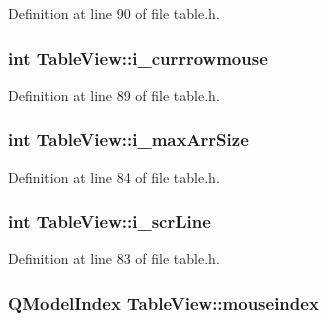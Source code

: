 Definition at line 90 of file table.h.

\hypertarget{classTableView_aed6ae9fb72681922a98a95e41ca84716}{
\subsubsection[{i\_\-currrowmouse}]{\setlength{\rightskip}{0pt plus 5cm}int {\bf TableView::i\_\-currrowmouse}}}
\label{classTableView_aed6ae9fb72681922a98a95e41ca84716}


Definition at line 89 of file table.h.

\hypertarget{classTableView_a02c154332908ba1622903ac621ef31bb}{
\subsubsection[{i\_\-maxArrSize}]{\setlength{\rightskip}{0pt plus 5cm}int {\bf TableView::i\_\-maxArrSize}}}
\label{classTableView_a02c154332908ba1622903ac621ef31bb}


Definition at line 84 of file table.h.

\hypertarget{classTableView_a5fc28c3171c5f26f2f60fac01173a57d}{
\subsubsection[{i\_\-scrLine}]{\setlength{\rightskip}{0pt plus 5cm}int {\bf TableView::i\_\-scrLine}}}
\label{classTableView_a5fc28c3171c5f26f2f60fac01173a57d}


Definition at line 83 of file table.h.

\hypertarget{classTableView_a489364559dd2e697eafec6cce3b67a1c}{
\subsubsection[{mouseindex}]{\setlength{\rightskip}{0pt plus 5cm}QModelIndex {\bf TableView::mouseindex}}}
\label{classTableView_a489364559dd2e697eafec6cce3b67a1c}


